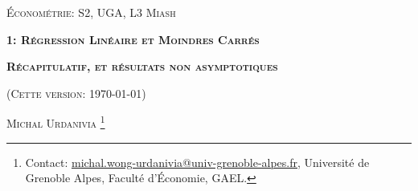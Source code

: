 


\usepackage{tikz}
\usepackage{enumitem}


\usepackage{fancyhdr}
\pagestyle{fancy}
\fancyhead{}
\fancyfoot{} 
\fancyfoot[C]{\small{\thepage}}
\renewcommand{\footrulewidth}{0pt}



 
\usetikzlibrary{positioning}
\usetikzlibrary{snakes}
\usetikzlibrary{calc}
\usetikzlibrary{arrows}
\usetikzlibrary{decorations.markings}
\usetikzlibrary{shapes.misc}
\usetikzlibrary{shapes}

\begin{titlepage}
\centering
	{\scshape\Large \textsc{Économétrie: S2, UGA, L3 Miash}\par}
	\vspace{1cm}
	{\Large\bfseries \textsc{1: Régression Linéaire et Moindres Carrés} \par}
    \vspace{1cm}   
	{\Large\bfseries \textsc{Récapitulatif, et résultats non asymptotiques} \par}
	\vspace{1cm}
	{(\textsc{Cette version: \today})\par}
	\vspace{1cm}
	{\large \textsc{Michal Urdanivia}
	\footnote{Contact:  
	\href{mailto:michal.wong-urdanivia@univ-grenoble-alpes.fr}{michal.wong-urdanivia@univ-grenoble-alpes.fr}, 
	 Université de Grenoble Alpes,  Faculté d'\'Economie, GAEL.}\par}
	
\end{titlepage}


